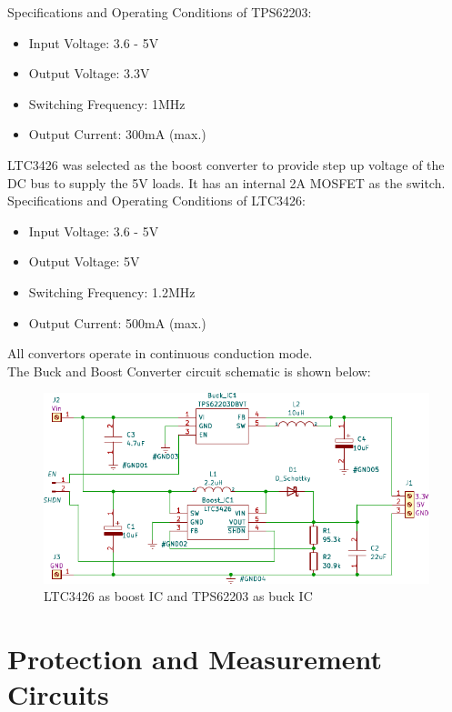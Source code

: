 Specifications and Operating Conditions of TPS62203:
\begin{itemize}
	\item Input Voltage: 3.6 - 5V
	\item Output Voltage:  3.3V
	\item Switching Frequency: 1MHz
	\item Output Current: 300mA (max.)
\end{itemize}


 LTC3426 was selected as the boost converter to provide step up voltage of the DC bus to supply the 5V loads. It has an internal 2A MOSFET as the switch.\\
 
  Specifications and Operating Conditions of LTC3426:
 \begin{itemize}
 	\item Input Voltage: 3.6 - 5V
 	\item Output Voltage: 5V
 	\item Switching Frequency: 1.2MHz
 	\item Output Current: 500mA (max.)
 \end{itemize}
All convertors operate in continuous conduction mode.\\

The Buck and Boost Converter circuit schematic is shown below:
\begin{figure}[ht]
	\centering
	\includegraphics[width=\columnwidth]{1.pdf}
	\caption{LTC3426 as boost IC and TPS62203 as buck IC}
	\label{fig:bubo}
\end{figure}



\section[Protection Circuits]{Protection and Measurement Circuits}


